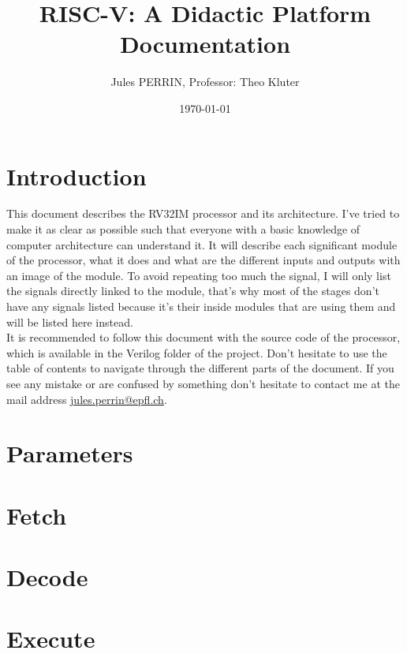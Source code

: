 \documentclass[12pt]{article}
\title{RISC-V: A Didactic Platform \\
\large Documentation}
\author{Jules PERRIN, Professor: Theo Kluter}
\date{\today}
\begin{document}
\maketitle
\tableofcontents

\section{Introduction}
This document describes the RV32IM processor and its architecture. I've tried to make it as clear 
as possible such that everyone with a basic knowledge of computer architecture can understand it.
It will describe each significant module of the processor, what it does and what are the different
inputs and outputs with an image of the module. To avoid repeating too much the signal, I will only list 
the signals directly linked to the module, that's why most of the stages don't have any signals listed because 
it's their inside modules that are using them and will be listed here instead. \\

It is recommended to follow this document with the source code of the processor, which is available
in the Verilog folder of the project.
Don't hesitate to use the table of contents to navigate through the different parts of the document.
If you see any mistake or are confused by something don't hesitate to contact me at the mail address
\href{mailto:jules.perrin@epfl.ch}{jules.perrin@epfl.ch}.

\section{Parameters}


\section{Fetch}




\section{Decode}






\section{Execute}



\end{document}
